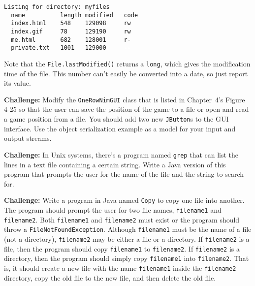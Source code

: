 \begin{EXRtwo}
\begin{jjjlisting}
\begin{lstlisting}
Listing for directory: myfiles
  name          length modified   code
  index.html    548    129098     rw
  index.gif     78     129190     rw
  me.html       682    128001     r-
  private.txt   1001   129000     --
\end{lstlisting}
\end{jjjlisting}

\noindent  Note that the {\tt File.lastModified()} returns a {\tt long},
which gives the modification time of the file.  This number can't
easily be converted into a date, so just report its value.

\item  {\bf Challenge:} Modify the {\tt OneRowNimGUI} class 
that is listed in Chapter~4's Figure~ 4-25 so that
the user can save the position of the game to a file or open and 
read a game position from a file.  You should add two new {\tt JButton}s
to the GUI interface. Use the object serialization example as a model
for your input and output streams.

\item  {\bf Challenge:} In Unix systems, there's a program named
{\tt grep} that can list the lines in a text file
containing a certain string.  Write a Java version of this program
that prompts the user for the name of the file and the string to search for.

\item  {\bf Challenge:} Write a program in Java named {\tt Copy} 
to copy one file into another.  The program should prompt the user
for two file names, {\tt filename1} and {\tt filename2}. 
Both {\tt filename1} and {\tt filename2} must exist or
the program should throw a {\tt FileNotFoundException}.  Although
{\tt filename1} must be the name of a file (not a directory),
{\tt filename2} may be either a file or a directory.  If {\tt filename2} is
a file, then the program should copy {\tt filename1} to
{\tt filename2}.  If {\tt filename2} is a directory, then the program
should simply copy {\tt filename1} into {\tt filename2}. That is, it
should create a new file with the name {\tt filename1} inside the
{\tt filename2} directory, copy the old file to the new file, and then
delete the old file.
\end{EXRtwo}
%
